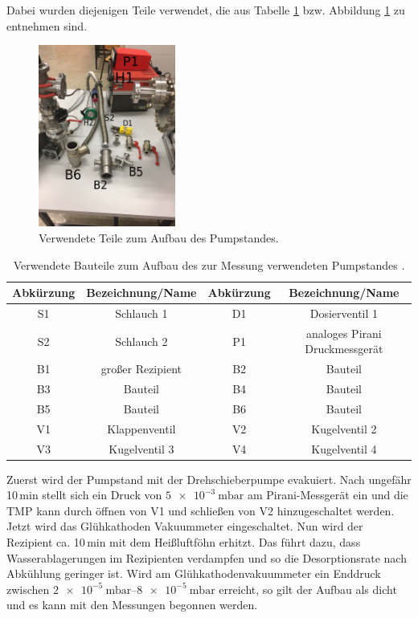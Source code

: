 Dabei wurden diejenigen Teile verwendet, die aus Tabelle \ref{tab:Teile} bzw. Abbildung
\ref{fig:Teile} zu entnehmen sind.

\begin{figure}
  \centering
  \includegraphics[width=0.4\textwidth]{IMG_6891.JPG}
  \caption{Verwendete Teile zum Aufbau des Pumpstandes.}
  \label{fig:Teile}
\end{figure}

\begin{table}
  \caption{Verwendete Bauteile zum Aufbau des zur Messung verwendeten Pumpstandes \cite{anleitung}.}
  \label{tab:Teile}
  \begin{tabular}{c c | c c}
    \toprule
    Abkürzung & Bezeichnung/Name & Abkürzung & Bezeichnung/Name \\
    \midrule
    S1 & Schlauch 1 & D1 & Dosierventil 1 \\
    S2 & Schlauch 2 & P1 & analoges Pirani Druckmessgerät \\
    B1 & großer Rezipient & B2 & Bauteil \\
    B3 & Bauteil & B4 & Bauteil \\
    B5 & Bauteil & B6 & Bauteil \\
    V1 & Klappenventil & V2 & Kugelventil 2 \\
    V3 & Kugelventil 3 & V4 & Kugelventil 4 \\
  \end{tabular}
\end{table}
Zuerst wird der Pumpstand mit der Drehschieberpumpe evakuiert. Nach ungefähr 10$\,$min
stellt sich ein Druck von $\SI{5e-3}{\milli\bar}$ am Pirani-Messgerät ein und die TMP
kann durch öffnen von V1 und schließen von V2 hinzugeschaltet werden.
Jetzt wird das Glühkathoden Vakuummeter eingeschaltet. Nun wird der Rezipient
ca. 10$\,$min mit dem Heißluftföhn erhitzt. Das führt dazu,
dass Wasserablagerungen im Rezipienten verdampfen und so die Desorptionsrate nach Abkühlung geringer ist.
Wird am Glühkathodenvakuummeter ein Enddruck zwischen $\SIrange{2e-5}{8e-5}{\milli\bar}$ erreicht, so gilt der
Aufbau als dicht und es kann mit den Messungen begonnen werden.

